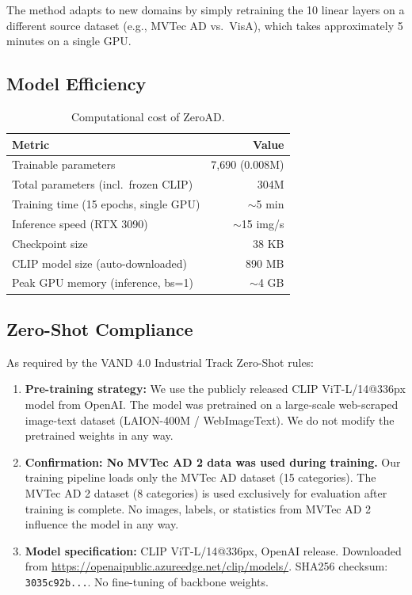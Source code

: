 \documentclass[10pt,twocolumn,letterpaper]{article}
\begin{document}
The method adapts to new domains by simply retraining the 10 linear layers on a different source dataset (e.g., MVTec AD vs.\ VisA), which takes approximately 5 minutes on a single GPU.

\subsection{Model Efficiency}

\begin{table}[h]
\centering
\small
\caption{Computational cost of ZeroAD.}
\begin{tabular}{l|r}
\hline
Metric & Value \\
\hline
Trainable parameters & 7,690 (0.008M) \\
Total parameters (incl.\ frozen CLIP) & 304M \\
Training time (15 epochs, single GPU) & $\sim$5 min \\
Inference speed (RTX 3090) & $\sim$15 img/s \\
Checkpoint size & 38 KB \\
CLIP model size (auto-downloaded) & 890 MB \\
Peak GPU memory (inference, bs=1) & $\sim$4 GB \\
\hline
\end{tabular}
\end{table}

\subsection{Zero-Shot Compliance}
\label{sec:zs_compliance}

As required by the VAND 4.0 Industrial Track Zero-Shot rules:

\begin{enumerate}[nosep]
  \item \textbf{Pre-training strategy:} We use the publicly released CLIP ViT-L/14@336px model from OpenAI. The model was pretrained on a large-scale web-scraped image-text dataset (LAION-400M / WebImageText). We do not modify the pretrained weights in any way.
  \item \textbf{Confirmation: No MVTec AD 2 data was used during training.} Our training pipeline loads only the MVTec AD dataset (15 categories). The MVTec AD 2 dataset (8 categories) is used exclusively for evaluation after training is complete. No images, labels, or statistics from MVTec AD 2 influence the model in any way.
  \item \textbf{Model specification:} CLIP ViT-L/14@336px, OpenAI release. Downloaded from \url{https://openaipublic.azureedge.net/clip/models/}. SHA256 checksum: \texttt{3035c92b...}. No fine-tuning of backbone weights.
\end{enumerate}
\end{document}
